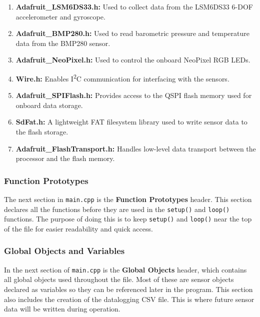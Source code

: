 \documentclass[12pt]{report}
\begin{document}
\begin{enumerate}
    \item \textbf{Adafruit\_LSM6DS33.h:} Used to collect data from the LSM6DS33 6-DOF accelerometer and gyroscope.
    \item \textbf{Adafruit\_BMP280.h:} Used to read barometric pressure and temperature data from the BMP280 sensor.
    \item \textbf{Adafruit\_NeoPixel.h:} Used to control the onboard NeoPixel RGB LEDs.
    \item \textbf{Wire.h:} Enables I\textsuperscript{2}C communication for interfacing with the sensors.
    \item \textbf{Adafruit\_SPIFlash.h:} Provides access to the QSPI flash memory used for onboard data storage.
    \item \textbf{SdFat.h:} A lightweight FAT filesystem library used to write sensor data to the flash storage.
    \item \textbf{Adafruit\_FlashTransport.h:} Handles low-level data transport between the processor and the flash memory.
\end{enumerate}

\subsubsection*{Function Prototypes}

The next section in \texttt{main.cpp} is the \textbf{Function Prototypes} header. This section declares all the functions before they are used in the \texttt{setup()} and \texttt{loop()} functions. The purpose of doing this is to keep \texttt{setup()} and \texttt{loop()} near the top of the file for easier readability and quick access. \\

\subsubsection*{Global Objects and Variables}

In the next section of \texttt{main.cpp} is the \textbf{Global Objects} header, which contains all global objects used throughout the file. Most of these are sensor objects declared as variables so they can be referenced later in the program. This section also includes the creation of the datalogging CSV file. This is where future sensor data will be written during operation. \\
\end{document}
